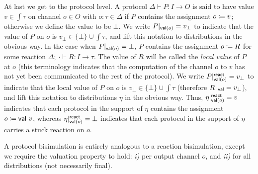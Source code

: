 At last we get to the protocol level. A protocol $\Delta \vdash P : I \to O$ is said to have value $v \in \int{\tau}$ on channel $o \in O$ with $o : \tau \in \Delta$ if $P$ contains the assignment $o \coloneqq v$; otherwise we define the value to be $\bot$. We write $P|_{\mathsf{val}(o)} = v_\bot$ to indicate that the value of $P$ on $o$ is $v_\bot \in \{\bot\} \cup \int{\tau}$, and lift this notation to distributions in the obvious way. In the case when $P|_{\mathsf{val}(o)} = \bot$, $P$ contains the assignment $o \coloneqq R$ for some reaction $\Delta; \ \cdot \vdash R : I \to \tau$. The value of $R$ will be called the \emph{local value} of $P$ at $o$ (this terminology indicates that the computation of the channel $o$ to $v$ has not yet been communicated to the rest of the protocol). We write $P|^{\mathsf{react}}_{\mathsf{val}(o)} = v_\bot$ to indicate that the local value of $P$ on $o$ is $v_\bot \in \{\bot\} \cup \int{\tau}$ (therefore $R \, |_{\mathsf{val}} = v_\bot$), and lift this notation to distributions $\eta$ in the obvious way. Thus, $\eta|^{\mathsf{react}}_{\mathsf{val}(o)} = v$ indicates that each protocol in the support of $\eta$ contains the assignment $o \coloneqq \mathsf{val} \ v$, whereas $\eta|^{\mathsf{react}}_{\mathsf{val}(o)} = \bot$ indicates that each protocol in the support of $\eta$ carries a stuck reaction on $o$.

A protocol bisimulation is entirely analogous to a reaction bisimulation, except we require the valuation property to hold: \emph{i)} per output channel $o$, and \emph{ii)} for all distributions (not necessarily final).

